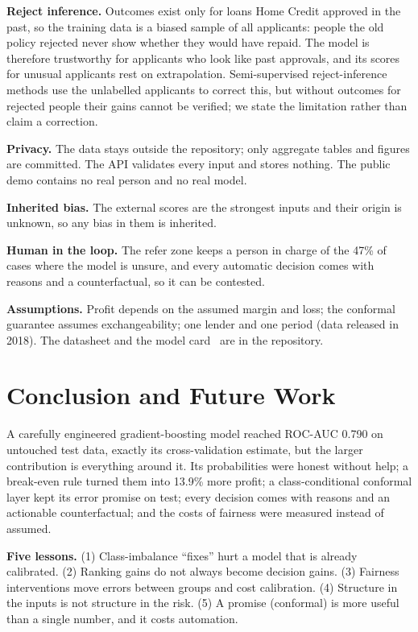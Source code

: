 \documentclass[conference,10pt]{IEEEtran}
\begin{document}
\textbf{Reject inference.} Outcomes exist only for loans Home Credit approved in the past, so
the training data is a biased sample of all applicants: people the old policy rejected never
show whether they would have repaid. The model is therefore trustworthy for applicants who look
like past approvals, and its scores for unusual applicants rest on extrapolation.
Semi-supervised reject-inference methods use the unlabelled applicants to correct this, but
without outcomes for rejected people their gains cannot be verified; we state the limitation
rather than claim a correction.

\textbf{Privacy.} The data stays outside the repository; only aggregate tables and figures are
committed. The API validates every input and stores nothing. The public demo contains no real
person and no real model.

\textbf{Inherited bias.} The external scores are the strongest inputs and their origin is
unknown, so any bias in them is inherited.

\textbf{Human in the loop.} The refer zone keeps a person in charge of the 47\% of cases where
the model is unsure, and every automatic decision comes with reasons and a counterfactual, so it
can be contested.

\textbf{Assumptions.} Profit depends on the assumed margin and loss; the conformal guarantee
assumes exchangeability; one lender and one period (data released in 2018). The datasheet and
the model card~\cite{gebru2021,mitchell2019} are in the repository.

\section{Conclusion and Future Work}
A carefully engineered gradient-boosting model reached ROC-AUC 0.790 on untouched test data,
exactly its cross-validation estimate, but the larger contribution is everything around it. Its
probabilities were honest without help; a break-even rule turned them into 13.9\% more profit; a
class-conditional conformal layer kept its error promise on test; every decision comes with
reasons and an actionable counterfactual; and the costs of fairness were measured instead of
assumed.

\textbf{Five lessons.}
(1) Class-imbalance ``fixes'' hurt a model that is already calibrated.
(2) Ranking gains do not always become decision gains.
(3) Fairness interventions move errors between groups and cost calibration.
(4) Structure in the inputs is not structure in the risk.
(5) A promise (conformal) is more useful than a single number, and it costs automation.
\end{document}

